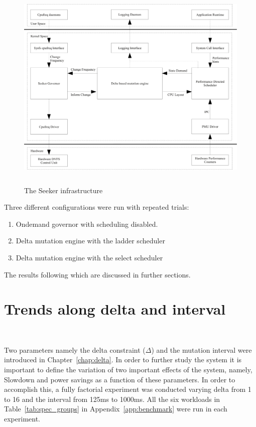 \begin{figure}[h!]
  \begin{center}
    \includegraphics[height=4in]{figures/seeker.jpg}%
    \caption{The Seeker infrastructure}
    \label{fig:entire_seeker}
  \end{center}
\end{figure}


Three different configurations were run with repeated trials: 
\begin{enumerate}
\item Ondemand governor with scheduling disabled. 
\item Delta mutation engine with the ladder scheduler
\item Delta mutation engine with the select scheduler
\end{enumerate}
The results following which are discussed in further sections. 

\section{Trends along delta and interval}~\label{sec:trends}

Two parameters namely the delta constraint ($\Delta$) and the mutation interval 
were introduced in Chapter~\ref{chap:delta}. In order to further study the system
it is important to define the variation of two important effects of the system,
namely, Slowdown and power savings as a function of these parameters. In order
to accomplish this, a fully factorial experiment was conducted varying delta 
from 1 to 16 and the interval from 125ms to 1000ms. All the six workloads in 
Table~\ref{tab:spec_groups} in Appendix~\ref{app:benchmark} were run in each 
experiment.


